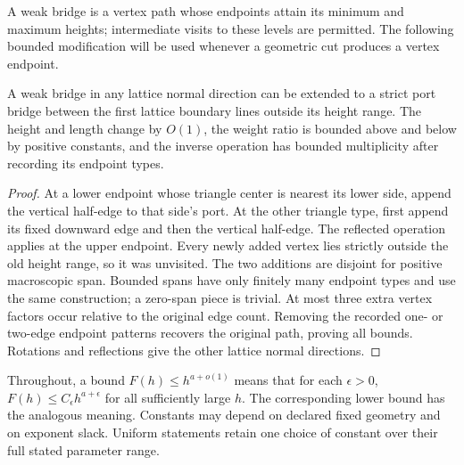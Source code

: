 A weak bridge is a vertex path whose endpoints attain its minimum and
maximum heights; intermediate visits to these levels are permitted.
The following bounded modification will be used whenever a geometric
cut produces a vertex endpoint.
\begin{lemma}\label{lem:port-extension}
A weak bridge in any lattice normal direction can be extended to a strict
port bridge between the first lattice boundary lines outside its height
range. The height and length change by \(O(1)\), the weight ratio is
bounded above and below by positive constants, and the inverse operation
has bounded multiplicity after recording its endpoint types.
\end{lemma}
\begin{proof}
At a lower endpoint whose triangle center is nearest its lower side,
append the vertical half-edge to that side's port. At the other triangle
type, first append its fixed downward edge and then the vertical half-edge.
The reflected operation applies at the upper endpoint. Every newly added
vertex lies strictly outside the old height range, so it was unvisited.
The two additions are disjoint for positive macroscopic span. Bounded
spans have only finitely many endpoint types and use the same construction;
a zero-span piece is trivial. At most three extra vertex factors occur
relative to the original edge count. Removing the recorded one- or
two-edge endpoint patterns recovers the original path, proving all bounds.
Rotations and reflections give the other lattice normal directions.
\end{proof}

Throughout, a bound \(F(h)\le h^{a+o(1)}\) means that for each
\(\epsilon>0\), \(F(h)\le C_\epsilon h^{a+\epsilon}\) for all
sufficiently large \(h\). The corresponding lower bound has the analogous
meaning. Constants may depend on declared fixed geometry and on exponent
slack. Uniform statements retain one choice of constant over their full
stated parameter range.

